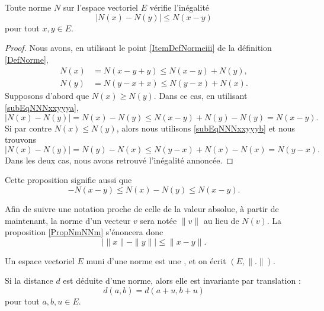 \begin{proposition}		\label{PropNmNNm}
	Toute norme $N$ sur l'espace vectoriel $E$ vérifie l'inégalité
	\begin{equation}
		\big| N(x)-N(y) \big|\leq N(x-y)
	\end{equation}
	pour tout $x,y\in E$.
\end{proposition}
	
\begin{proof}
	Nous avons, en utilisant le point \ref{ItemDefNormeiii} de la définition \ref{DefNorme},
	\begin{subequations}
		\begin{align}
			N(x)&=N(x-y+y)\leq N(x-y)+N(y),	\label{subEqNNNxxyyya}\\
			N(y)&=N(y-x+x)\leq N(y-x)+N(x).	\label{subEqNNNxxyyyb}
		\end{align}
	\end{subequations}
	Supposons d'abord que $N(x)\geq N(y)$. Dans ce cas, en utilisant \eqref{subEqNNNxxyyya},
	\begin{equation}
		\big| N(x)-N(y) \big|=N(x)-N(y)\leq N(x-y)+N(y)-N(y)=N(x-y).
	\end{equation}
	Si par contre $N(x)\leq N(y)$, alors nous utilisons \eqref{subEqNNNxxyyyb} et nous trouvons
	\begin{equation}
		\big| N(x)-N(y) \big|=N(y)-N(x)\leq N(y-x)+N(x)-N(x)=N(y-x).
	\end{equation}
	Dans les deux cas, nous avons retrouvé l'inégalité annoncée.
\end{proof}
Cette proposition signifie aussi que
\begin{equation}	\label{EqNleqNNleqNvqlqbs}
	-N(x-y)\leq N(x)-N(y)\leq N(x-y).
\end{equation}

Afin de suivre une notation proche de celle de la valeur absolue, à partir de maintenant, la norme d'un vecteur $v$ sera notée $\| v\|$ au lieu de $N(v)$. La proposition \ref{PropNmNNm} s'énoncera donc
\begin{equation}
\big| \| x \|-\| y \| \big|\leq \| x-y \|.
\end{equation}
\begin{definition}		\label{DefEVNetDistance}
	Un espace vectoriel $E$ muni d'une norme est une , et on écrit $(E,\| . \|)$. 
\end{definition}

Si la distance \( d\) est déduite d'une norme, alors elle est invariante par translation :
\begin{equation}    \label{EqooYMVKooGrudhf}
    d(a,b)=d(a+u,b+u)
\end{equation}
pour tout \( a,b,u\in E\).

